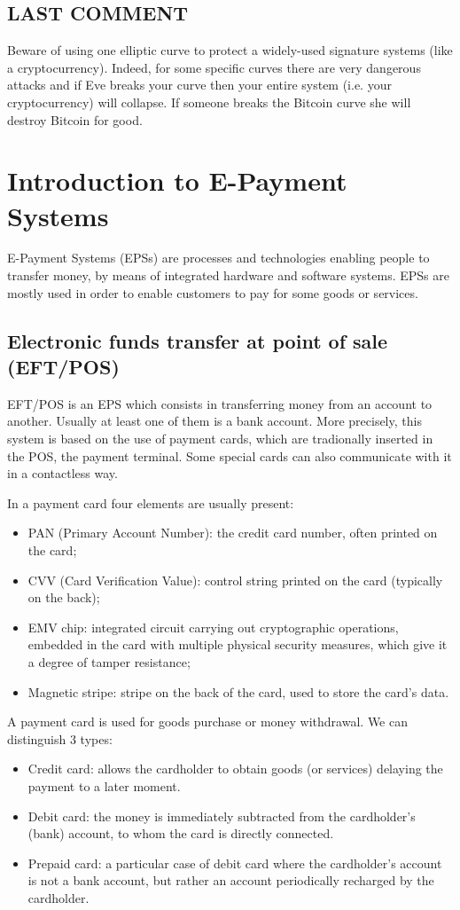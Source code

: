 \documentclass[a4paper, 10pt, titlepage]{article}
\begin{document}
\subsection*{LAST COMMENT}
Beware of using one elliptic curve to protect a widely-used signature systems (like a cryptocurrency).
Indeed, for some specific curves there are very dangerous attacks and if Eve breaks your curve then your entire system (i.e. your cryptocurrency) will collapse. If someone breaks the Bitcoin curve she will destroy Bitcoin for good.

\newpage
\section{Introduction to E-Payment Systems}
E-Payment Systems (EPSs) are processes and technologies enabling people to transfer money, by means of integrated hardware and software systems. EPSs are mostly used in order to enable customers to pay for some goods or services.
\subsection{Electronic funds transfer at point of sale (EFT/POS)}
EFT/POS is an EPS which consists in transferring money from an account to another. Usually at least one of them is a bank account. More precisely, this system is based on the use of payment cards, which are tradionally inserted in the POS, the payment terminal.
Some special cards can also communicate with it in a contactless way.

In a payment card four elements are usually present:
\begin{itemize}
\item PAN (Primary Account Number): the credit card number, often printed on the card;
\item CVV (Card Verification Value): control string printed on the card (typically on the back);
\item EMV chip: integrated circuit carrying out cryptographic operations, embedded in the card with multiple physical security measures, which give it a degree of tamper resistance;
\item Magnetic stripe: stripe on the back of the card, used to store the card's data.
\end{itemize}
A payment card is used for goods purchase or money withdrawal. We can distinguish 3 types:
\begin{itemize}
\item Credit card: allows the cardholder to obtain goods (or services) delaying the payment to a later moment.
\item Debit card: the money is immediately subtracted from the cardholder's (bank) account, to whom the card is directly connected.
\item Prepaid card: a particular case of debit card where the cardholder's account is not a bank account, but rather an account periodically recharged by the cardholder.
\end{itemize}
\end{document}
